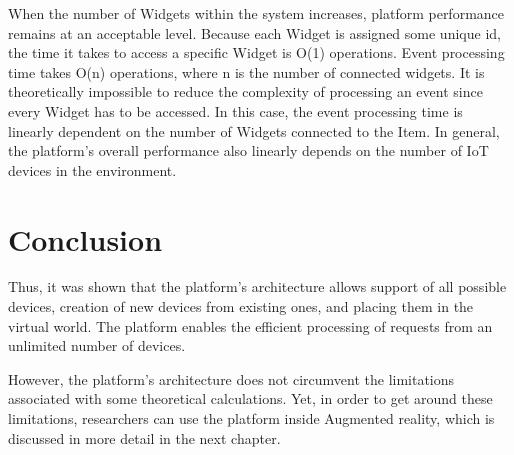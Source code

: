 When the number of Widgets within the system increases, platform performance remains at an acceptable level. Because each Widget is assigned some unique id, the time it takes to access a specific Widget is O(1) operations. Event processing time takes O(n) operations, where n is the number of connected widgets. It is theoretically impossible to reduce the complexity of processing an event since every Widget has to be accessed. In this case, the event processing time is linearly dependent on the number of Widgets connected to the Item. In general, the platform's overall performance also linearly depends on the number of IoT devices in the environment.

\section{Conclusion}

Thus, it was shown that the platform's architecture allows support of all possible devices, creation of new devices from existing ones, and placing them in the virtual world. The platform enables the efficient processing of requests from an unlimited number of devices.

However, the platform's architecture does not circumvent the limitations associated with some theoretical calculations. Yet, in order to get around these limitations, researchers can use the platform inside Augmented reality, which is discussed in more detail in the next chapter.